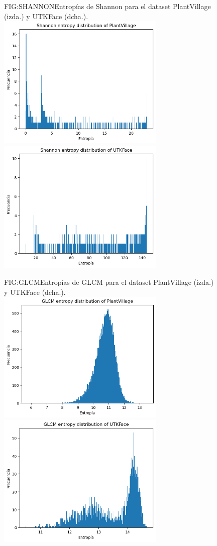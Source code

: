 \begin{figure}[Entropías de Shannon]{FIG:SHANNON}{Entropías de Shannon para el dataset PlantVillage (izda.) y UTKFace (dcha.).}
    \centering
    \includegraphics[width=8cm]{img/icv/shannon_PV.png}
    \includegraphics[width=8cm]{img/icv/shannon_UTK.png}
\end{figure}

\begin{figure}[Entropías GLCM]{FIG:GLCM}{Entropías de GLCM para el dataset PlantVillage (izda.) y UTKFace (dcha.).}
    \centering
    \includegraphics[width=8cm]{img/icv/glcm_PV.png}
    \includegraphics[width=8cm]{img/icv/glcm_UTK.png}
\end{figure}

